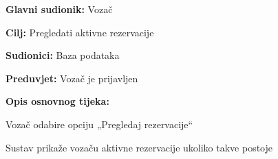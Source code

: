 					\noindent {}
					\begin{packed_item}
						
						\item  \textbf{Glavni sudionik: } Vozač
						\item  \textbf{Cilj:} Pregledati aktivne rezervacije
						\item  \textbf{Sudionici:} Baza podataka
						\item  \textbf{Preduvjet:} Vozač je prijavljen
						\item  \textbf{Opis osnovnog tijeka:}
						
						\item[] \begin{packed_enum}
							\item Vozač odabire opciju „Pregledaj rezervacije“
							\item Sustav prikaže vozaču aktivne rezervacije ukoliko takve postoje
						\end{packed_enum}
					
					\end{packed_item}
					
